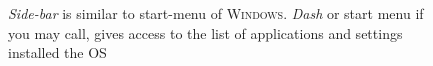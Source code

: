 \documentclass{tufte-book} %
\begin{document}
\begin{figure}[p]
  
 \vspace{\baselineskip}
  \caption[Appearance of Ubuntu Desktop]{\emph{Side-bar} is similar to start-menu of \textsc{Windows}. \emph{Dash} or start menu if you may call, gives access to the list of applications and settings installed the OS}

\end{figure}
\end{document}
